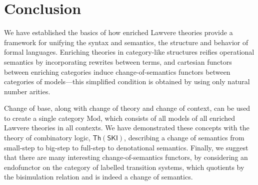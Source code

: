\documentclass{amsart}
\theoremstyle{definition}
\newcommand{\Th}{\mathsf{Th}}
\begin{document}
\section{Conclusion}
\label{sec:conclusion}

We have established the basics of how enriched Lawvere theories provide a framework for unifying the syntax and semantics, the structure and behavior of formal languages. Enriching theories in category-like structures reifies operational semantics by incorporating rewrites between terms, and cartesian functors between enriching categories induce change-of-semantics functors between categories of models---this simplified condition is obtained by using only natural number arities.

Change of base, along with change of theory and change of context, can be used to create
a single category $\mathrm{Mod}$, which consists of all models of all enriched Lawvere theories in all contexts. We have demonstrated these concepts with the theory of combinatory logic, $\Th(\mathsf{SKI})$, describing a change of semantics from small-step to big-step to full-step to denotational semantics. Finally, we suggest that there are many interesting change-of-semantics functors, by considering an endofunctor on the category of labelled transition systems, which quotients by the bisimulation relation and is indeed a change of semantics.
\end{document}
